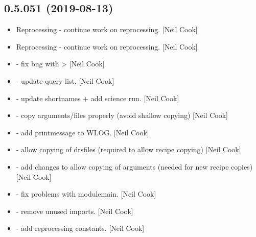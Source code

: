 \documentclass[a4paper,10pt,english]{report}
\begin{document}
\subsection{0.5.051 (2019-08-13)}
\label{\detokenize{misc/changelog:id92}}\begin{itemize}
\item {} 
Reprocessing - continue work on reprocessing. {[}Neil Cook{]}

\item {} 
Reprocessing - continue work on reprocessing. {[}Neil Cook{]}

\item {} 
 - fix bug with 
\textendash{}\textgreater{}  {[}Neil Cook{]}

\item {} 
 - update query list. {[}Neil Cook{]}

\item {} 
 - update shortnames +
add science run. {[}Neil Cook{]}

\item {} 
 - copy arguments/files properly (avoid shallow
copying) {[}Neil Cook{]}

\item {} 
 - add printmessage to WLOG. {[}Neil Cook{]}

\item {} 
 - allow copying of drsfiles (required to allow
recipe copying) {[}Neil Cook{]}

\item {} 
 - add changes to allow copying of arguments
(needed for new recipe copies) {[}Neil Cook{]}

\item {} 
 - fix problems with modulemain. {[}Neil Cook{]}

\item {} 
 - remove unused imports. {[}Neil Cook{]}

\item {} 
 - add reprocessing constants. {[}Neil Cook{]}


\end{itemize}
\end{document}

